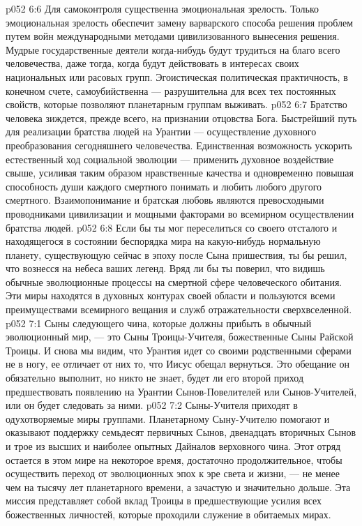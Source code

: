 \vs p052 6:6 \pc {}\bibnobreakspace {} Для самоконтроля существенна эмоциональная зрелость. Только эмоциональная зрелость обеспечит замену варварского способа решения проблем путем войн международными методами цивилизованного вынесения решения. Мудрые государственные деятели когда\hyp{}нибудь будут трудиться на благо всего человечества, даже тогда, когда будут действовать в интересах своих национальных или расовых групп. Эгоистическая политическая практичность, в конечном счете, самоубийственна --- разрушительна для всех тех постоянных свойств, которые позволяют планетарным группам выживать.
\vs p052 6:7 \pc {}\bibnobreakspace {} Братство человека зиждется, прежде всего, на признании отцовства Бога. Быстрейший путь для реализации братства людей на Урантии --- осуществление духовного преобразования сегодняшнего человечества. Единственная возможность ускорить естественный ход социальной эволюции --- применить духовное воздействие свыше, усиливая таким образом нравственные качества и одновременно повышая способность души каждого смертного понимать и любить любого другого смертного. Взаимопонимание и братская любовь являются превосходными проводниками цивилизации и мощными факторами во всемирном осуществлении братства людей.
\vs p052 6:8 \pc Если бы ты мог переселиться со своего отсталого и находящегося в состоянии беспорядка мира на какую\hyp{}нибудь нормальную планету, существующую сейчас в эпоху после Сына пришествия, ты бы решил, что вознесся на небеса ваших легенд. Вряд ли бы ты поверил, что видишь обычные эволюционные процессы на смертной сфере человеческого обитания. Эти миры находятся в духовных контурах своей области и пользуются всеми преимуществами всемирного вещания и служб отражательности сверхвселенной.
\vs p052 7:1 Сыны следующего чина, которые должны прибыть в обычный эволюционный мир, --- это Сыны Троицы\hyp{}Учителя, божественные Сыны Райской Троицы. И снова мы видим, что Урантия идет со своими родственными сферами не в ногу, ее отличает от них то, что Иисус обещал вернуться. Это обещание он обязательно выполнит, но никто не знает, будет ли его второй приход предшествовать появлению на Урантии Сынов\hyp{}Повелителей или Сынов\hyp{}Учителей, или он будет следовать за ними.
\vs p052 7:2 Сыны\hyp{}Учителя приходят в одухотворяемые миры группами. Планетарному Сыну\hyp{}Учителю помогают и оказывают поддержку семьдесят первичных Сынов, двенадцать вторичных Сынов и трое из высших и наиболее опытных Дайналов верховного чина. Этот отряд остается в этом мире на некоторое время, достаточно продолжительное, чтобы осуществить переход от эволюционных эпох к эре света и жизни, --- не менее чем на тысячу лет планетарного времени, а зачастую и значительно дольше. Эта миссия представляет собой вклад Троицы в предшествующие усилия всех божественных личностей, которые проходили служение в обитаемых мирах.
